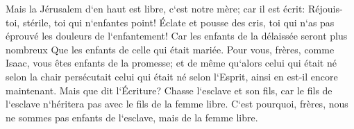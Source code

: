 \verse Mais la Jérusalem d`en haut est libre, c`est notre mère; 
\verse car il est écrit: Réjouis-toi, stérile, toi qui n`enfantes point! Éclate et pousse des cris, toi qui n`as pas éprouvé les douleurs de l`enfantement! Car les enfants de la délaissée seront plus nombreux Que les enfants de celle qui était mariée. 
\verse Pour vous, frères, comme Isaac, vous êtes enfants de la promesse; 
\verse et de même qu`alors celui qui était né selon la chair persécutait celui qui était né selon l`Esprit, ainsi en est-il encore maintenant. 
\verse Mais que dit l`Écriture? Chasse l`esclave et son fils, car le fils de l`esclave n`héritera pas avec le fils de la femme libre. 
\verse C`est pourquoi, frères, nous ne sommes pas enfants de l`esclave, mais de la femme libre. 

\chapter{}

